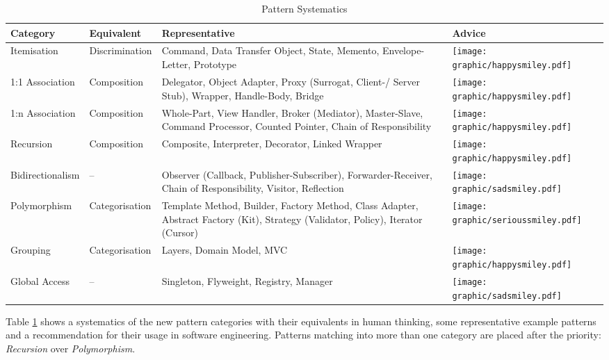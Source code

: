 \begin{table}[ht]
    \begin{center}
        \begin{footnotesize}
        \begin{tabular}{| p{20mm} | p{20mm} | p{50mm} | p{10mm} |}
            \hline
            \textbf{Category} & \textbf{Equivalent} & \textbf{Representative} & \textbf{Advice}\\
            \hline
            Itemisation & Discrimination & Command, Data Transfer Object, State, Memento, Envelope-Letter, Prototype & \vfill \texttt{[image: graphic/happysmiley.pdf]}\\
            \hline
            1:1 Association & Composition & Delegator, Object Adapter, Proxy (Surrogat, Client-/ Server Stub), Wrapper, Handle-Body, Bridge & \vfill \texttt{[image: graphic/happysmiley.pdf]}\\
            \hline
            1:n Association & Composition & Whole-Part, View Handler, Broker (Mediator), Master-Slave, Command Processor, Counted Pointer, Chain of Responsibility & \vfill \texttt{[image: graphic/happysmiley.pdf]}\\
            \hline
            Recursion & Composition & Composite, Interpreter, Decorator, Linked Wrapper & \vfill \texttt{[image: graphic/happysmiley.pdf]}\\
            \hline
            Bidirectionalism & -- & Observer (Callback, Publisher-Subscriber), Forwarder-Receiver, Chain of Responsibility, Visitor, Reflection & \vfill \texttt{[image: graphic/sadsmiley.pdf]}\\
            \hline
            Polymorphism & Categorisation & Template Method, Builder, Factory Method, Class Adapter, Abstract Factory (Kit), Strategy (Validator, Policy), Iterator (Cursor) & \vfill \texttt{[image: graphic/serioussmiley.pdf]}\\
            \hline
            Grouping & Categorisation & Layers, Domain Model, MVC & \vfill \texttt{[image: graphic/happysmiley.pdf]}\\
            \hline
            Global Access & -- & Singleton, Flyweight, Registry, Manager & \vfill \texttt{[image: graphic/sadsmiley.pdf]}\\
            \hline
        \end{tabular}
        \end{footnotesize}
        \caption{Pattern Systematics}
        \label{pattern_systematics_table}
    \end{center}
\end{table}

Table \ref{pattern_systematics_table} shows a systematics of the new pattern
categories with their equivalents in human thinking, some representative
example patterns and a recommendation for their usage in software engineering.
Patterns matching into more than one category are placed after the priority:
\emph{Recursion} over \emph{Polymorphism}.
